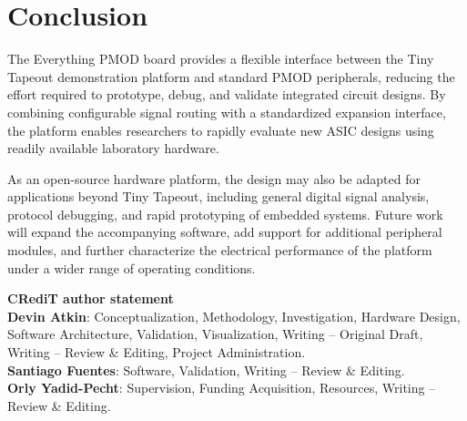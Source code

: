 \section{Conclusion}

The Everything PMOD board provides a flexible interface between the Tiny Tapeout demonstration platform and standard PMOD peripherals, reducing the effort required to prototype, debug, and validate integrated circuit designs. By combining configurable signal routing with a standardized expansion interface, the platform enables researchers to rapidly evaluate new ASIC designs using readily available laboratory hardware.

As an open-source hardware platform, the design may also be adapted for applications beyond Tiny Tapeout, including general digital signal analysis, protocol debugging, and rapid prototyping of embedded systems. Future work will expand the accompanying software, add support for additional peripheral modules, and further characterize the electrical performance of the platform under a wider range of operating conditions.

\textbf{CRediT author statement}\\
\noindent
\textbf{Devin Atkin}: Conceptualization, Methodology, Investigation, Hardware Design, Software Architecture, Validation, Visualization, Writing -- Original Draft, Writing -- Review \& Editing, Project Administration.\\

\noindent
\textbf{Santiago Fuentes}: Software, Validation, Writing -- Review \& Editing.\\

\noindent
\textbf{Orly Yadid-Pecht}: Supervision, Funding Acquisition, Resources, Writing -- Review \& Editing.